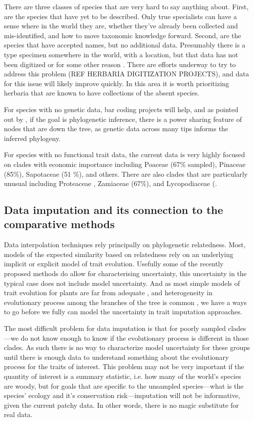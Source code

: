 \documentclass[a4paper,11pt]{article}
\begin{document}
There are three classes of species that are very hard to say anything about.  First, are the species that have yet to be described.  Only true specialists can have a sense where in the world they are, whether they've already been collected and mis-identified, and how to move taxonomic knowledge forward.  Second, are the species that have accepted names, but no additional data.  Presumably there is a type specimen somewhere in the world, with a location, but that data has not been digitized or for some other reason .  There are efforts underway to try to address this problem (REF HERBARIA DIGITIZATION PROJECTS), and data for this issue will likely improve quickly.  In this area it is worth prioritizing herbaria that are known to have collections of the absent species.  

For species with no genetic data, bar coding projects \citep{li2015plant} will help, and as pointed out by \cite{hinchliff2014some}, if the goal is phylogenetic inference, there is a power sharing feature of nodes that are down the tree, as genetic data across many tips informs the inferred phylogeny. 

For species with no functional trait data, the current data is very highly focused on clades with economic importance including Poaceae (67\% sampled), Pinaceae (85\%), Sapotaceae (51 \%), and others.  There are also clades that are particularly unusual including Proteaceae \citep[73\% see][]{Cornwell}, Zamiaceae (67\%), and Lycopodiaceae (.  

\subsection{Data imputation and its connection to the comparative methods}

Data interpolation techniques rely principally on phylogenetic relatedness.  
Most, models of the expected similarity based on relatedness rely on an underlying implicit or explicit model of trait evolution.  
Usefully some of the recently proposed methods do allow for characterising uncertainty, this uncertainty in the typical case
does not include model uncertainty.  And as most simple models of trait evolution for plants are far from adequate \citep{pennell2014model}, and heterogeneity in evolutionary process among the branches of the tree is common \citep{eastman2011novel},
we have a ways to go before we fully can model the uncertainty in trait imputation approaches.   

The most difficult problem for data imputation is that for poorly sampled clades---we do not know enough to know if the evolutionary process is different in those clades.  As such there is no way to characterize model uncertainty for these groups until there is enough data to understand something about the evolutionary process for the traits of interest.  This problem may not be very important if the quantity of interest is a summary statistic, i.e. how many of the world's species are woody, but for goals that are specific to the unsampled species---what is the species' ecology and it's conservation risk---imputation will not be informative, given the current patchy data.  In other words, there is no magic substitute for real data.  
\end{document}
